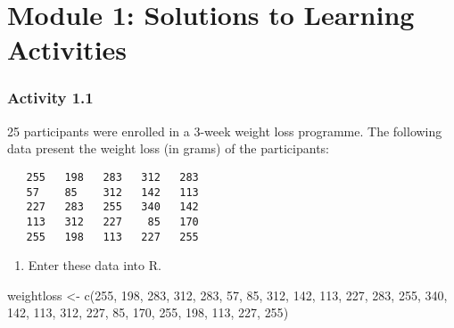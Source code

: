 \documentclass[
]{memoir}
\newenvironment{Shaded}{\begin{snugshade}}{\end{snugshade}}
\newcommand{\DecValTok}[1]{\textcolor[rgb]{0.00,0.00,0.81}{#1}}
\newcommand{\FunctionTok}[1]{\textcolor[rgb]{0.00,0.00,0.00}{#1}}
\newcommand{\NormalTok}[1]{#1}
\newcommand{\OtherTok}[1]{\textcolor[rgb]{0.56,0.35,0.01}{#1}}
\providecommand{\tightlist}{%
  \setlength{\itemsep}{0pt}\setlength{\parskip}{0pt}}
\begin{document}
\hypertarget{module-1-solutions-to-learning-activities}{%
\chapter*{Module 1: Solutions to Learning Activities}\label{module-1-solutions-to-learning-activities}}

\hypertarget{activity-1.1}{%
\subsection*{Activity 1.1}\label{activity-1.1}}

25 participants were enrolled in a 3-week weight loss programme. The following data present the weight loss (in grams) of the participants:

\begin{verbatim}
   255   198   283   312   283
   57    85    312   142   113
   227   283   255   340   142
   113   312   227    85   170
   255   198   113   227   255
\end{verbatim}

\begin{enumerate}
\def\labelenumi{\alph{enumi})}
\tightlist
\item
  Enter these data into R.
\end{enumerate}

\begin{Shaded}
\begin{Highlighting}[]
\NormalTok{weightloss }\OtherTok{\textless{}{-}} \FunctionTok{c}\NormalTok{(}\DecValTok{255}\NormalTok{, }\DecValTok{198}\NormalTok{, }\DecValTok{283}\NormalTok{, }\DecValTok{312}\NormalTok{, }\DecValTok{283}\NormalTok{, }\DecValTok{57}\NormalTok{,  }\DecValTok{85}\NormalTok{, }\DecValTok{312}\NormalTok{, }\DecValTok{142}\NormalTok{, }\DecValTok{113}\NormalTok{,}
                \DecValTok{227}\NormalTok{, }\DecValTok{283}\NormalTok{, }\DecValTok{255}\NormalTok{, }\DecValTok{340}\NormalTok{, }\DecValTok{142}\NormalTok{, }\DecValTok{113}\NormalTok{, }\DecValTok{312}\NormalTok{, }\DecValTok{227}\NormalTok{,  }\DecValTok{85}\NormalTok{, }\DecValTok{170}\NormalTok{,}
                \DecValTok{255}\NormalTok{, }\DecValTok{198}\NormalTok{, }\DecValTok{113}\NormalTok{, }\DecValTok{227}\NormalTok{, }\DecValTok{255}\NormalTok{)}
\end{Highlighting}
\end{Shaded}
\end{document}
